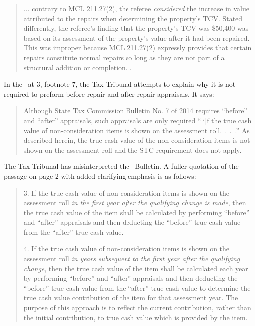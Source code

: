 \documentclass[12pt,\documentclassflag]{michiganCourtOfAppealsBrief}
\begin{document}
\begin{quote}
... contrary to MCL 211.27(2), the referee \textit{considered} the increase in value attributed to the repairs when determining the property's TCV. Stated differently, the referee's finding that the property's TCV was \$50,400 was based on its assessment of the property's value after it had been repaired. This was improper because MCL 211.27(2) expressly provides that certain repairs constitute normal repairs so long as they are not part of a structural addition or completion. .
\end{quote}

In the \reconsiderationDenied\ at 3, footnote 7, the Tax Tribunal attempts to explain why it is not required to preform before-repair and after-repair appraisals. It says: 

\begin{quote}
	Although State Tax Commission Bulletin No. 7 of 2014 requires ``before'' and ``after'' appraisals, such appraisals are only required ``[i]f the true cash value of non-consideration items is shown on the assessment roll. .~.~.'' As described herein, the true cash value of the non-consideration items is not shown on the assessment roll and the STC requirement does not apply.
\end{quote}

The Tax Tribunal has misinterpreted the \STC\ Bulletin. A fuller quotation of the passage on page 2 with added clarifying emphasis is as follows:

\begin{quotation}
3. If the true cash value of non-consideration items is shown on the assessment roll \textit{in the first year after the qualifying change is made}, then the true cash value of the item shall be calculated by performing ``before'' and ``after'' appraisals and then deducting the ``before'' true cash value from the ``after'' true cash value.

4. If the true cash value of non-consideration items is shown on the assessment roll \textit{in years subsequent to the first year after the qualifying change}, then the true cash value of the item shall be calculated each year by performing ``before'' and ``after'' appraisals and then deducting the ``before'' true cash value from the ``after'' true cash value to determine the true cash value contribution of the item for that assessment year. The purpose of this approach is to reflect the current contribution, rather than the initial contribution, to true cash value which is provided by the item.
\end{quotation}
\end{document}
